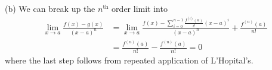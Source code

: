(b) We can break up the $n^{\text{th}}$ order limit into
\begin{align*}
        \lim_{x \to  a} \frac{f(x) - g(x)}{(x - a)^n} &=
        \lim_{x \to a} \frac{f(x) - \sum_{i = 0}^{n - 1} \frac{f^{(i)}(a)}{i!} (x - a)^i}{(x - a)^n} +
        \frac{f^{(n)}(a)}{n!} \\
                                                      &= \frac{f^{(n)}(a)}{n!} - \frac{f^{(n)}(a)}{n!} = 0
\end{align*}
where the last step follows from repeated application of L'Hopital's.
